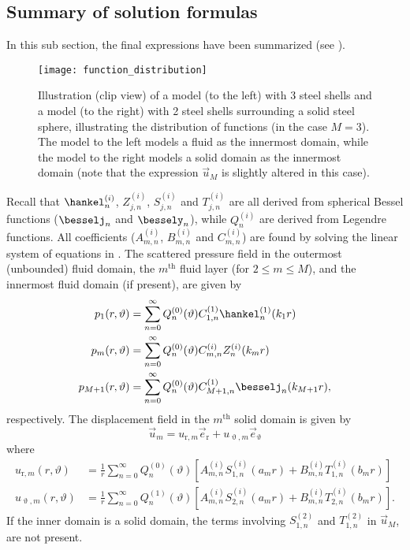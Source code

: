 \subsection{Summary of solution formulas}
In this sub section, the final expressions have been summarized (see ).
\begin{figure}
	\centering
	\texttt{[image: function\_distribution]}
	\caption{Illustration (clip view) of a model (to the left) with 3 steel shells and a model (to the right) with 2 steel shells surrounding a solid steel sphere, illustrating the distribution of functions (in the case $M=3$). The model to the left models a fluid as the innermost domain, while the model to the right models a solid domain as the innermost domain (note that the expression $\vec{u}_M$ is slightly altered in this case).}
	\label{Fig1:function_distribution}
\end{figure}
Recall that $\hankel_n^{(i)}$, $Z_{j,n}^{(i)}$, $S_{j,n}^{(i)}$ and $T_{j,n}^{(i)}$ are all derived from spherical Bessel functions ($\besselj_n$ and $\bessely_n$), while $Q_n^{(i)}$ are derived from Legendre functions. All coefficients ($A_{m,n}^{(i)}$, $B_{m,n}^{(i)}$ and $C_{m,n}^{(i)}$) are found by solving the linear system of equations in . The scattered pressure field in the outermost (unbounded) fluid domain, the $m^{\mathrm{th}}$ fluid layer (for $2\leq m \leq M$), and the innermost fluid domain (if present), are given by
\begin{align}\label{Eq1:Summary_p1}
p_1(r,\vartheta) &= \sum_{n=0}^\infty Q_n^{(0)}(\vartheta) C_{1,n}^{(1)} \hankel^{(1)}_n(k_1 r)\\\label{Eq1:Summary_pm}
p_m(r,\vartheta) &= \sum_{n=0}^\infty Q_n^{(0)}(\vartheta)C_{m,n}^{(i)} Z_n^{(i)}(k_m r)\\
	p_{M+1}(r,\vartheta) &= \sum_{n=0}^\infty Q_n^{(0)}(\vartheta) C_{M+1,n}^{(1)} \besselj_n(k_{M+1} r),\label{Eq1:Summary_pM1}
\end{align}
respectively. The displacement field in the $m^{\mathrm{th}}$ solid domain is given by
\begin{equation}
	\vec{u}_m = u_{\mathrm{r},m} \vec{e}_{\mathrm{r}} + u_{\upvartheta,m} \vec{e}_\upvartheta\label{Eq1:Summary_u}
\end{equation}
where
\begin{align}
	u_{\mathrm{r},m}(r,\vartheta) &= \frac{1}{r}\sum_{n=0}^\infty Q_n^{(0)}(\vartheta)\left[A_{m,n}^{(i)}S_{1,n}^{(i)}(a_m r)+B_{m,n}^{(i)}T_{1,n}^{(i)}(b_m r)\right]\\
	u_{\upvartheta,m}(r,\vartheta) &= \frac{1}{r}\sum_{n=0}^\infty Q_n^{(1)}(\vartheta)\left[A_{m,n}^{(i)}S_{2,n}^{(i)}(a_m r)+B_{m,n}^{(i)}T_{2,n}^{(i)}(b_m r)\right].
\end{align} 
If the inner domain is a solid domain, the terms involving $S_{1,n}^{(2)}$ and $T_{1,n}^{(2)}$ in $\vec{u}_M$, are not present.
